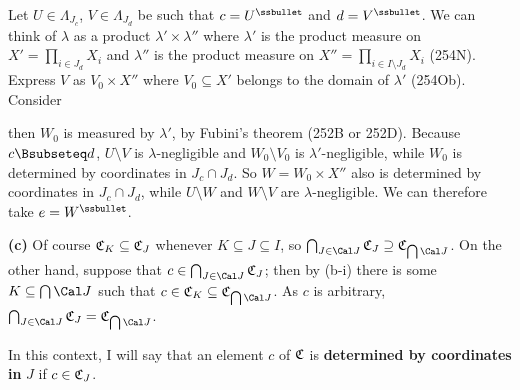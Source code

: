 {\medskip

 Let $U\in\Lambda_{J_c}$, $V\in\Lambda_{J_d}$ be such that
$c=U^{\ssbullet}$ and $d=V^{\ssbullet}$.   We can think of
$\lambda$ as a product $\lambda'\times\lambda''$ where $\lambda'$ is the
product measure on $X'=\prod_{i\in J_d}X_i$ and $\lambda''$ is the product
measure on $X''=\prod_{i\in I\setminus J_d}X_i$ (254N).   Express $V$ as
$V_0\times X''$ where $V_0\subseteq X'$ belongs to the domain of
$\lambda'$ (254Ob).   Consider


\noindent then $W_0$ is measured by $\lambda'$, by Fubini's theorem
(252B or 252D).
Because $c\Bsubseteq d$, $U\setminus V$ is $\lambda$-negligible
and $W_0\setminus V_0$ is $\lambda'$-negligible, while $W_0$ is determined
by coordinates in $J_c\cap J_d$.   So $W=W_0\times X''$ also is determined
by coordinates in $J_c\cap J_d$, while $U\setminus W$ and $W\setminus V$
are $\lambda$-negligible.   We can therefore take $e=W^{\ssbullet}$.


\medskip

{\bf (c)} Of course $\frak C_K\subseteq\frak C_J$ whenever $K\subseteq
J\subseteq I$, so
$\bigcap_{J\in\Cal J}\frak C_J\supseteq\frak C_{\bigcap\Cal J}$.   On
the other hand, suppose that $c\in\bigcap_{J\in\Cal J}\frak C_J$;  then
by (b-i) there is some $K\subseteq\bigcap\Cal J$ such that $c\in\frak
C_K\subseteq\frak C_{\bigcap\Cal J}$.   As $c$ is arbitrary,
$\bigcap_{J\in\Cal J}\frak C_J=\frak C_{\bigcap\Cal J}$.
}%

 In this context, I will say that an element
$c$ of $\frak C$ is {\bf determined by coordinates in} $J$ if
$c\in\frak C_J$.

